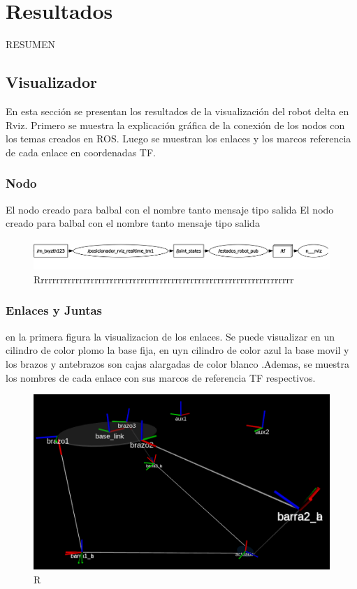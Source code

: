 \chapter{Resultados}\label{CAP7}
RESUMEN 


\section{Visualizador}
        En esta sección se presentan los resultados de la visualización del robot delta en Rviz. Primero se muestra la explicación gráfica de la conexión de los nodos con los temas creados en ROS. Luego se muestran los enlaces y los marcos referencia de cada enlace en coordenadas TF. 

    \subsection{Nodo}
    El nodo creado para balbal con el nombre tanto 
    mensaje tipo 
    salida
        El nodo creado para balbal con el nombre tanto 
    mensaje tipo 
    salida
        \begin{figure}[h]
            \centering
            \includegraphics[width=1.0\linewidth]{Main/Chapter7/Images7/nodo_1.png}
            \caption{Rrrrrrrrrrrrrrrrrrrrrrrrrrrrrrrrrrrrrrrrrrrrrrrrrrrrrrrrrrrrrrrrrrr}
            \label{f:cap7_rviz1111}
        \end{figure} 

\newpage

    \subsection{Enlaces y Juntas}
        en la primera figura la visualizacion de los enlaces. Se puede visualizar en un cilindro de color plomo la base fija, en uyn cilindro de color azul la base movil y los brazos y antebrazos son cajas alargadas de color blanco .Ademas, se muestra los nombres de cada enlace con sus marcos de referencia TF respectivos.
        \begin{figure}[h]
            \centering
            \includegraphics[width=0.6\linewidth]{Main/Chapter7/Images7/rviz_2.png}
            \caption{R}
            \label{f:cap7_rviz_2}
        \end{figure}  
        
